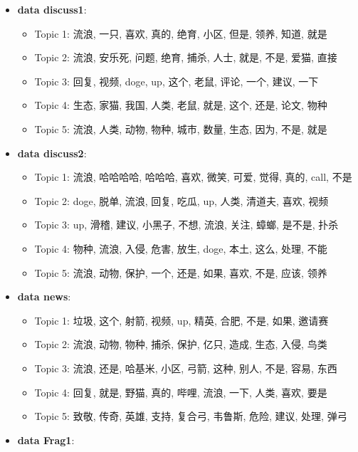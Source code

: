 \documentclass[12pt,a4paper]{ctexart}
\begin{document}
\begin{itemize}
    \item \textbf{data discuss1}:
    \begin{itemize}
        \item Topic 1: 流浪, 一只, 喜欢, 真的, 绝育, 小区, 但是, 领养, 知道, 就是
        \item Topic 2: 流浪, 安乐死, 问题, 绝育, 捕杀, 人士, 就是, 不是, 爱猫, 直接
        \item Topic 3: 回复, 视频, doge, up, 这个, 老鼠, 评论, 一个, 建议, 一下
        \item Topic 4: 生态, 家猫, 我国, 人类, 老鼠, 就是, 这个, 还是, 论文, 物种
        \item Topic 5: 流浪, 人类, 动物, 物种, 城市, 数量, 生态, 因为, 不是, 就是
    \end{itemize}
    \item \textbf{data discuss2}:
    \begin{itemize}
        \item Topic 1: 流浪, 哈哈哈哈, 哈哈哈, 喜欢, 微笑, 可爱, 觉得, 真的, call, 不是
        \item Topic 2: doge, 脱单, 流浪, 回复, 吃瓜, up, 人类, 清道夫, 喜欢, 视频
        \item Topic 3: up, 滑稽, 建议, 小黑子, 不想, 流浪, 关注, 蟑螂, 是不是, 扑杀
        \item Topic 4: 物种, 流浪, 入侵, 危害, 放生, doge, 本土, 这么, 处理, 不能
        \item Topic 5: 流浪, 动物, 保护, 一个, 还是, 如果, 喜欢, 不是, 应该, 领养
    \end{itemize}
    \item \textbf{data news}:
    \begin{itemize}
        \item Topic 1: 垃圾, 这个, 射箭, 视频, up, 精英, 合肥, 不是, 如果, 邀请赛
        \item Topic 2: 流浪, 动物, 物种, 捕杀, 保护, 亿只, 造成, 生态, 入侵, 鸟类
        \item Topic 3: 流浪, 还是, 哈基米, 小区, 弓箭, 这种, 别人, 不是, 容易, 东西
        \item Topic 4: 回复, 就是, 野猫, 真的, 哔哩, 流浪, 一下, 人类, 喜欢, 要是
        \item Topic 5: 致敬, 传奇, 英雄, 支持, 复合弓, 韦鲁斯, 危险, 建议, 处理, 弹弓
    \end{itemize}
    \item \textbf{data Frag1}:
    \begin{itemize}

\end{itemize}
\end{itemize}
\end{document}
